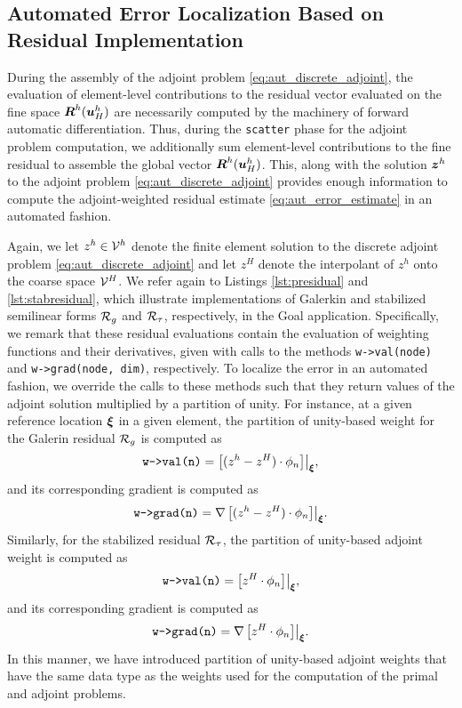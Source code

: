 \subsection{Automated Error Localization Based on Residual Implementation}

During the assembly of the adjoint problem
\eqref{eq:aut_discrete_adjoint}, the evaluation of element-level
contributions to the residual vector evaluated on the fine space
$\boldsymbol{R}^h(\boldsymbol{u}^h_H)$ are necessarily computed by the machinery
of forward automatic differentiation. Thus,
during the \texttt{scatter} phase for the adjoint problem computation,
we additionally sum element-level contributions to the fine residual
to assemble the global vector $\boldsymbol{R}^h(\boldsymbol{u}^h_H)$. This, along
with the solution $\boldsymbol{z}^h$ to the adjoint problem
\eqref{eq:aut_discrete_adjoint} provides enough
information to compute the adjoint-weighted residual estimate
\eqref{eq:aut_error_estimate} in an automated fashion.

Again, we let $z^h \in \mathcal{V}^h$ denote the finite element solution to
the discrete adjoint problem \eqref{eq:aut_discrete_adjoint} and let
$z^H$ denote the interpolant of $z^h$ onto the coarse space $\mathcal{V}^H$.
We refer again to Listings \ref{lst:presidual} and \ref{lst:stabresidual},
which illustrate implementations of Galerkin and stabilized semilinear
forms $\mathcal{R}_g$ and $\mathcal{R}_{\tau}$, respectively, in the Goal application.
Specifically, we remark that these residual evaluations contain
the evaluation of weighting functions and their derivatives, given with
calls to the methods \texttt{w->val(node)} and \texttt{w->grad(node, dim)},
respectively. To localize the error in an automated fashion, we override
the calls to these methods such that they return values of the adjoint
solution multiplied by a partition of unity. For instance, at a given
reference location $\boldsymbol{\xi}$ in a given element, the
partition of unity-based
weight for the Galerin residual $\mathcal{R}_g$ is computed as
%
\begin{gather}
\texttt{w->val(n)} = \left[ (z^h - z^H) \cdot \phi_n \right] \bigr|_{\boldsymbol{\xi}},
\end{gather}
%
and its corresponding gradient is computed as
%
\begin{gather}
\texttt{w->grad(n)} = \nabla \left[ ( z^h - z^H) \cdot \phi_n \right] \bigr|_{\boldsymbol{\xi}}.
\end{gather}
%
Similarly, for the stabilized residual $\mathcal{R}_{\tau}$, the
partition of unity-based adjoint
weight is computed as
%
\begin{gather}
\texttt{w->val(n)} = \left[ z^H \cdot \phi_n \right] \bigr|_{\boldsymbol{\xi}},
\end{gather}
%
and its corresponding gradient is computed as
%
\begin{gather}
\texttt{w->grad(n)} = \nabla \left[  z^H \cdot \phi_n \right] \bigr|_{\boldsymbol{\xi}}.
\end{gather}
%
In this manner, we have introduced partition of unity-based adjoint weights
that have the
same data type as the weights used for the computation of the primal and
adjoint problems.

